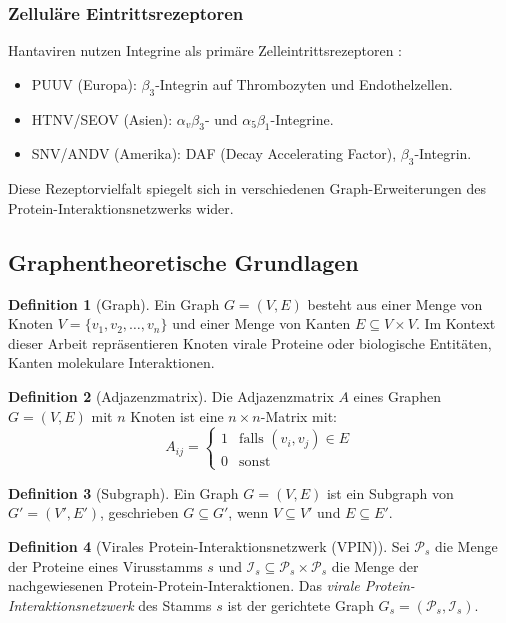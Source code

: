 ﻿\documentclass[a4paper,12pt]{article}
\theoremstyle{definition}
\newtheorem{definition}{Definition}
\begin{document}
\subsubsection{Zellul\"are Eintrittsrezeptoren}

Hantaviren nutzen Integrine als prim\"are Zelleintrittsrezeptoren \cite{Bhatt2021}:
\begin{itemize}
    \item PUUV (Europa): $\beta_3$-Integrin auf Thrombozyten und Endothelzellen.
    \item HTNV/SEOV (Asien): $\alpha_v\beta_3$- und $\alpha_5\beta_1$-Integrine.
    \item SNV/ANDV (Amerika): DAF (Decay Accelerating Factor), $\beta_3$-Integrin.
\end{itemize}
Diese Rezeptorvielfalt spiegelt sich in verschiedenen Graph-Erweiterungen
des Protein-Interaktionsnetzwerks wider.

\subsection{Graphentheoretische Grundlagen}

\begin{definition}[Graph]
    Ein Graph $G = (V, E)$ besteht aus einer Menge von Knoten $V = \{v_1, v_2, \ldots, v_n\}$
    und einer Menge von Kanten $E \subseteq V \times V$.
    Im Kontext dieser Arbeit repr\"asentieren Knoten virale Proteine oder
    biologische Entit\"aten, Kanten molekulare Interaktionen.
\end{definition}

\begin{definition}[Adjazenzmatrix]
    Die Adjazenzmatrix $A$ eines Graphen $G = (V, E)$ mit $n$ Knoten ist eine
    $n \times n$-Matrix mit:
    \[
        A_{ij} = \begin{cases} 1 & \text{falls } (v_i, v_j) \in E \\ 0 & \text{sonst} \end{cases}
    \]
\end{definition}

\begin{definition}[Subgraph]
    Ein Graph $G = (V, E)$ ist ein Subgraph von $G' = (V', E')$,
    geschrieben $G \subseteq G'$, wenn $V \subseteq V'$ und $E \subseteq E'$.
\end{definition}

\begin{definition}[Virales Protein-Interaktionsnetzwerk (VPIN)]
    Sei $\mathcal{P}_s$ die Menge der Proteine eines Virusstamms $s$ und
    $\mathcal{I}_s \subseteq \mathcal{P}_s \times \mathcal{P}_s$ die Menge
    der nachgewiesenen Protein-Protein-Interaktionen. Das \emph{virale
    Protein-Interaktionsnetzwerk} des Stamms $s$ ist der gerichtete Graph
    $G_s = (\mathcal{P}_s, \mathcal{I}_s)$.
\end{definition}
\end{document}
